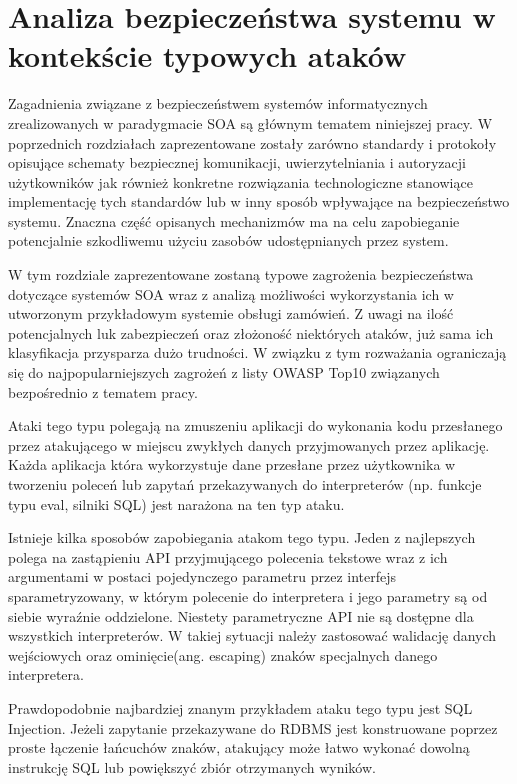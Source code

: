 \chapter{Analiza bezpieczeństwa systemu w kontekście typowych ataków}
\label{cha:bezpieczenstwo}

{\it

	Zagadnienia związane z bezpieczeństwem systemów informatycznych zrealizowanych w paradygmacie SOA są głównym tematem niniejszej pracy.  W poprzednich rozdziałach zaprezentowane zostały zarówno standardy i protokoły opisujące schematy bezpiecznej komunikacji, uwierzytelniania i autoryzacji użytkowników jak również konkretne rozwiązania technologiczne  stanowiące implementację tych standardów lub w inny sposób wpływające na bezpieczeństwo systemu. Znaczna część opisanych mechanizmów ma na celu zapobieganie potencjalnie szkodliwemu użyciu zasobów udostępnianych przez system. 
	
	W tym rozdziale zaprezentowane zostaną typowe zagrożenia bezpieczeństwa dotyczące systemów SOA wraz z analizą możliwości wykorzystania ich w utworzonym przykładowym systemie obsługi zamówień. Z uwagi na ilość potencjalnych luk zabezpieczeń oraz złożoność niektórych ataków, już sama ich klasyfikacja  przysparza dużo trudności. W związku z tym rozważania ograniczają się do najpopularniejszych zagrożeń z listy OWASP Top10\cite{OWASP:2013}  związanych bezpośrednio z tematem pracy.

}


	Ataki tego typu polegają na zmuszeniu aplikacji do wykonania kodu przesłanego przez atakującego w miejscu zwykłych danych przyjmowanych przez aplikację. Każda aplikacja która wykorzystuje dane przesłane przez użytkownika w tworzeniu poleceń lub zapytań przekazywanych do interpreterów (np. funkcje typu eval, silniki SQL) jest narażona na ten typ ataku.  
	
	Istnieje kilka sposobów zapobiegania atakom tego typu. Jeden z najlepszych polega na zastąpieniu API przyjmującego polecenia tekstowe wraz z ich argumentami w postaci pojedynczego parametru przez interfejs sparametryzowany, w którym polecenie do interpretera i jego parametry są od siebie wyraźnie oddzielone. Niestety  parametryczne API nie są  dostępne dla wszystkich interpreterów. W takiej sytuacji należy zastosować walidację danych wejściowych oraz ominięcie(ang. escaping) znaków specjalnych danego interpretera.
	
	Prawdopodobnie najbardziej znanym przykładem ataku tego typu jest SQL Injection. Jeżeli zapytanie przekazywane do RDBMS jest konstruowane poprzez proste łączenie łańcuchów znaków, atakujący może łatwo wykonać dowolną instrukcję SQL lub powiększyć zbiór otrzymanych wyników. 
	
